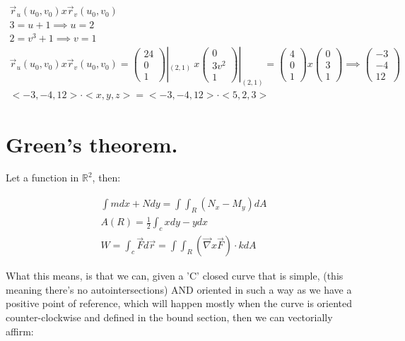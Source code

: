 \documentclass[11pt,fleqn]{book} %
\begin{document}
\begin{gather}
    \vec{r}_u (u_0, v_0) x \vec{r}_v (u_0, v_0)\\
    3 = u + 1 \implies u = 2\\
    2 = v^3 + 1 \implies v = 1\\
    \vec{r}_u (u_0, v_0) x \vec{r}_v (u_0, v_0) = \begin{pmatrix}
        24 \\ 0 \\ 1
    \end{pmatrix}|_{(2,1)}\
    x\begin{pmatrix}
        0 \\3v^2 \\ 1
    \end{pmatrix}|_{(2,1)}
    = \begin{pmatrix}
        4 \\0 \\1
    \end{pmatrix} x \begin{pmatrix}
        0 \\3\\1
    \end{pmatrix} \implies \begin{pmatrix}
        -3 \\ -4 \\ 12
    \end{pmatrix}\\
    <-3,-4,12> \cdot <x,y,z> = <-3,-4,12> \cdot <5,2,3>
\end{gather}

\section{Green's theorem.}

Let a function in $\mathbb{R}^2$, then:

\begin{gather}
    \int m dx + Ndy = \int \int_R (N_x - M_y) dA \\
    A(R) = \frac{1}{2} \int_c x dy - y dx\\
    W = \int_c \vec{F} d\vec{r} = \int \int_R (\vec{\nabla} x \vec{F}) \cdot k dA
\end{gather}

What this means, is that we can, given a 'C' closed curve that is simple,
(this meaning there's no autointersections) AND oriented in such a way as we have a positive 
point of reference, which will happen mostly when the curve is oriented counter-clockwise and defined
in the bound section, then we can vectorially affirm:
\end{document}
